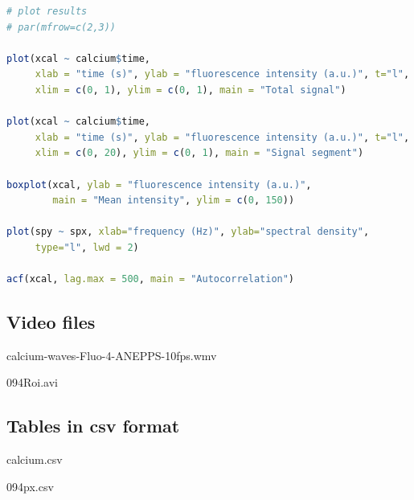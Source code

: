 \documentclass{biophys-new}
\begin{document}
\begin{lstlisting}[language=R]
# plot results
# par(mfrow=c(2,3))

plot(xcal ~ calcium$time,
     xlab = "time (s)", ylab = "fluorescence intensity (a.u.)", t="l",
     xlim = c(0, 1), ylim = c(0, 1), main = "Total signal")

plot(xcal ~ calcium$time,
     xlab = "time (s)", ylab = "fluorescence intensity (a.u.)", t="l",
     xlim = c(0, 20), ylim = c(0, 1), main = "Signal segment")

boxplot(xcal, ylab = "fluorescence intensity (a.u.)",
        main = "Mean intensity", ylim = c(0, 150))

plot(spy ~ spx, xlab="frequency (Hz)", ylab="spectral density",
     type="l", lwd = 2)

acf(xcal, lag.max = 500, main = "Autocorrelation")

\end{lstlisting}

\subsection*{Video files}

calcium-waves-Fluo-4-ANEPPS-10fps.wmv

094Roi.avi

\subsection*{Tables in csv format}

calcium.csv

094px.csv

\end{document}
